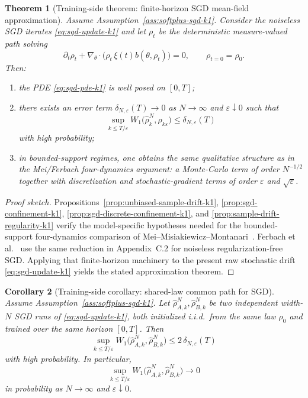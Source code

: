 \documentclass[11pt]{article}
\newtheorem{theorem}{Theorem}
\newtheorem{corollary}[theorem]{Corollary}
\theoremstyle{definition}
\begin{document}
\begin{theorem}[Training-side theorem: finite-horizon SGD mean-field approximation]
\label{thm:sgd-mean-field-k1}
Assume Assumption~\ref{ass:softplus-sgd-k1}. Consider the noiseless SGD
iterates \eqref{eq:sgd-update-k1} and let $\rho_t$ be the deterministic
measure-valued path solving
\begin{equation}
  \partial_t \rho_t
  +
  \nabla_\theta\cdot\bigl(\rho_t\,\xi(t)b(\theta,\rho_t)\bigr)
  =
  0,
  \qquad
  \rho_{t=0}=\rho_0.
  \label{eq:sgd-pde-k1}
\end{equation}
Then:
\begin{enumerate}[label=(\roman*)]
  \item the PDE \eqref{eq:sgd-pde-k1} is well posed on $[0,T]$;
  \item there exists an error term $\delta_{N,\varepsilon}(T)\to 0$ as
  $N\to\infty$ and $\varepsilon\downarrow 0$ such that
  \[
    \sup_{k\le T/\varepsilon}
    W_1\!\bigl(\hat\rho_k^N,\rho_{k\varepsilon}\bigr)
    \le
    \delta_{N,\varepsilon}(T)
  \]
  with high probability;
  \item in bounded-support regimes, one obtains the same qualitative structure
  as in the Mei/Ferbach four-dynamics argument: a Monte-Carlo term of order
  $N^{-1/2}$ together with discretization and stochastic-gradient terms of
  order $\varepsilon$ and $\sqrt{\varepsilon}$.
\end{enumerate}
\end{theorem}

\begin{proof}[Proof sketch]
Propositions~\ref{prop:unbiased-sample-drift-k1},
\ref{prop:sgd-confinement-k1}, \ref{prop:sgd-discrete-confinement-k1}, and
\ref{prop:sample-drift-regularity-k1} verify the model-specific hypotheses
needed for the bounded-support four-dynamics comparison of
Mei--Misiakiewicz--Montanari~\cite{MeiMisiakiewiczMontanari2019}. Ferbach et
al.~\cite{Ferbach2024} use the same reduction in Appendix~C.2 for noiseless
regularization-free SGD. Applying that finite-horizon machinery to the present
raw stochastic drift \eqref{eq:sgd-update-k1} yields the stated approximation
theorem.
\end{proof}

\begin{corollary}[Training-side corollary: shared-law common path for SGD]
\label{cor:sgd-common-path-k1}
Assume Assumption~\ref{ass:softplus-sgd-k1}. Let
$\hat\rho_{A,k}^N,\hat\rho_{B,k}^N$ be two independent width-$N$ SGD runs of
\eqref{eq:sgd-update-k1}, both initialized i.i.d.\ from the same law $\rho_0$
and trained over the same horizon $[0,T]$. Then
\[
  \sup_{k\le T/\varepsilon}
  W_1\!\bigl(\hat\rho_{A,k}^N,\hat\rho_{B,k}^N\bigr)
  \le
  2\,\delta_{N,\varepsilon}(T)
\]
with high probability. In particular,
\[
  \sup_{k\le T/\varepsilon}
  W_1\!\bigl(\hat\rho_{A,k}^N,\hat\rho_{B,k}^N\bigr)\to 0
\]
in probability as $N\to\infty$ and $\varepsilon\downarrow 0$.
\end{corollary}
\end{document}
